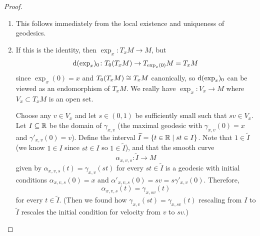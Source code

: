 \begin{proof}
\begin{enumerate}
\item This follows immediately from the local existence and uniqueness
  of geodesics.
\item If this is the identity, then $\exp_{x}\colon T_{x}M\to M$, but
\begin{equation}
\mathrm{d}(\exp_{x})_{0}\colon T_{0}(T_{x}M)\to T_{\exp_{x}(0)}M=T_{x}M
\end{equation}
since $\exp_{x}(0)=x$ and $T_{0}(T_{x}M)\cong T_{x}M$ canonically, so
$\mathrm{d}(\exp_{x})_{0}$ can be viewed as an endomorphism of $T_{x}M$.
We really have $\exp_{x}\colon V_{x}\to M$ where $V_{x}\subset T_{x}M$
is an open set.

Choose any $v\in V_{x}$ and let $s\in(0,1)$ be sufficiently small such
that $sv\in V_{x}$. Let $I\subseteq\mathbb{R}$ be the domain of $\gamma_{x,v}$
(the maximal geodesic with $\gamma_{x,v}(0)=x$ and $\gamma'_{x,v}(0)=v$).
Define the interval $\widetilde{I}=\{t\in\mathbb{R}\mid st\in I\}$. Note that
$1\in\widetilde{I}$ (we know $1\in I$ since $st\in I$ so $1\in\widetilde{I}$),
and that the smooth curve
\begin{equation}
\alpha_{x,v,s}\colon\widetilde{I}\to M
\end{equation}
given by $\alpha_{x,v,s}(t)=\gamma_{x,v}(st)$ for every
$st\in\widetilde{I}$ is a geodesic with initial conditions
$\alpha_{x,v,s}(0)=x$ and
$\alpha'_{x,v,s}(0)=sv=s\gamma'_{x,v}(0)$. Therefore,
\begin{equation}
\alpha_{x,v,s}(t)=\gamma_{x,sv}(t)
\end{equation}
for every $t\in\widetilde{I}$. (Then we found how
$\gamma_{x,v}(st)=\gamma_{x,sv}(t)$ rescaling from $I$ to
$\widetilde{I}$ rescales the initial condition for velocity from $v$
to $sv$.)


\end{enumerate}
\end{proof}
